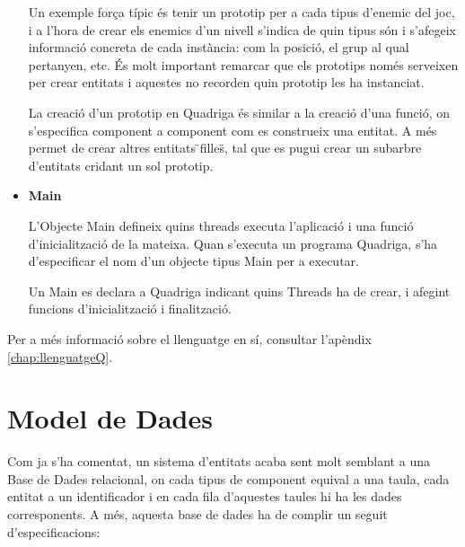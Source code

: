 \begin{itemize}
      Un exemple força típic és tenir un prototip per a cada tipus d'enemic del joc, i a l'hora de crear els enemics d'un nivell s'indica de quin tipus són i s'afegeix informació concreta de cada instància: com la posició, el grup al qual pertanyen, etc. És molt important remarcar que els prototips només serveixen per crear entitats i aquestes no recorden quin prototip les ha instanciat.
      
      La creació d'un prototip en Quadriga és similar a la creació d'una funció, on s'especifica component a component com es construeix una entitat. A més permet de crear altres entitats \"{}filles\"{}, tal que es pugui crear un subarbre d'entitats cridant un sol prototip.

    \item{\bf Main}

      L'Objecte Main defineix quins threads executa l'aplicació i una funció d'inicialització de la mateixa. Quan s'executa un programa Quadriga, s'ha d'especificar el nom d'un objecte tipus Main per a executar.
    
      Un Main es declara a Quadriga indicant quins Threads ha de crear, i afegint funcions d'inicialització i finalització.
    
  \end{itemize}
  
  Per a més informació sobre el llenguatge en sí, consultar l'apèndix \ref{chap:llenguatgeQ}.

\section{Model de Dades}

  Com ja s'ha comentat, un sistema d'entitats acaba sent molt semblant a una Base de Dades relacional, on cada tipus de component equival a una taula, cada entitat a un identificador i en cada fila d'aquestes taules hi ha les dades corresponents. A més, aquesta base de dades ha de complir un seguit d'especificacions:

